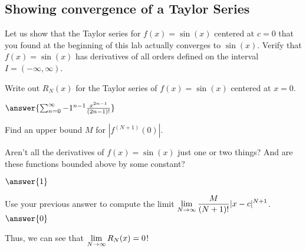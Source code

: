 \documentclass{ximera}
\begin{document}
\subsection*{Showing convergence of a Taylor Series}
Let us show that the Taylor series for $f(x) = \sin(x)$ centered at $c=0$ that you found at the beginning of this lab actually converges to $\sin(x)$.
Verify that $f(x) = \sin(x)$ has derivatives of all orders defined on the interval $I=(-\infty, \infty)$.

\begin{question}
Write out $R_N(x)$ for the Taylor series of $f(x) = \sin(x)$ centered at $x=0$.

$\answer{\sum_{n=0}^\infty -1^{n-1}\frac{x^{2n-1}}{(2n-1)!}}$

Find an upper bound $M$ for $|f^{(N+1)}(0)|$. \begin{hint} Aren't all the derivatives of $f(x) = \sin(x)$ just one or two things? And are these functions bounded above by some constant?\end{hint}

$\answer{1}$


Use your previous answer to compute the limit $\displaystyle \lim_{N \to \infty} \displaystyle\frac{M}{(N+1)!}|x-c|^{N+1}$.
$\answer{0}$
\end{question}
Thus, we can see that $\displaystyle \lim_{N \to \infty} R_N(x) = 0$!
\end{document}
